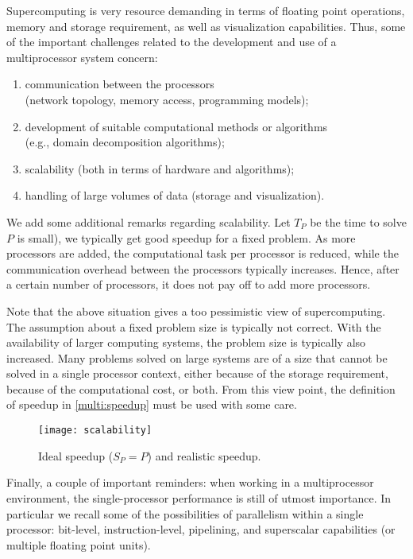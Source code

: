 Supercomputing is very resource demanding in terms of floating point operations,
memory and storage requirement, as well as visualization capabilities. Thus,
some of the important challenges related to the development and use of a
multiprocessor system concern:
\begin{enumerate}
\item communication between the processors \\
(network topology, memory access, programming models);
\item development of suitable computational methods or algorithms \\
(e.g., domain decomposition algorithms);
\item scalability (both in terms of hardware and algorithms);
\item handling of large volumes of data (storage and visualization).
\end{enumerate}

We add some additional remarks regarding scalability. Let $T_P$ be the time to
solve  $P$ is small), we
typically get good speedup for a fixed problem. As more processors are added,
the computational task per processor is reduced, while the communication
overhead between the processors typically increases. Hence, after a certain
number of processors, it does not pay off to add more processors.

Note that the above situation gives a too pessimistic view of supercomputing.
The assumption about a fixed problem size is typically not correct. With the
availability of larger computing systems, the problem size is typically also
increased. Many problems solved on large systems are of a size that cannot be
solved in a single processor context, either because of the storage requirement,
because of the computational cost, or both. From this view point, the definition
of speedup in \eqref{multi:speedup} must be used with some care.

\begin{figure}[htbp]
  \begin{center}
    \texttt{[image: scalability]}
  \end{center}
  \caption{Ideal speedup ($S_P = P$) and realistic speedup.}
  \label{fig:scalability}
\end{figure}

Finally, a couple of important reminders: when working in a multiprocessor
environment, the single-processor performance is still of utmost importance. In
particular we recall some of the possibilities of parallelism within a single
processor: bit-level, instruction-level, pipelining, and superscalar
capabilities (or multiple floating point units).

